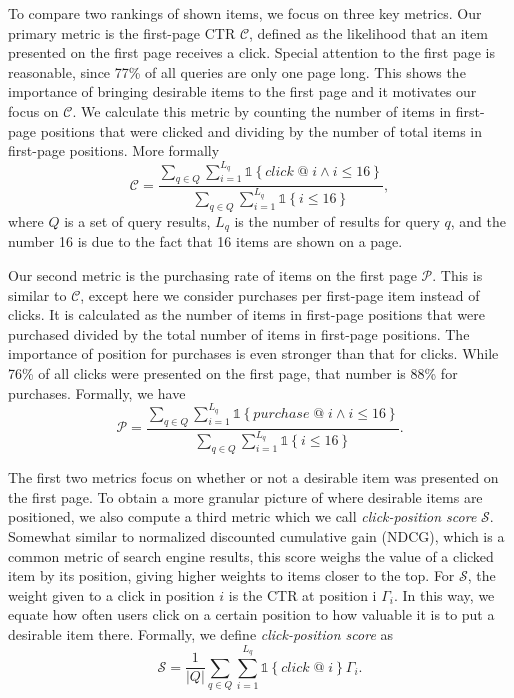 \documentclass{article}
\begin{document}
To compare two rankings of shown items, we focus on three key metrics. Our primary 
metric is the first-page CTR $\mathscr{C}$, defined as the likelihood that an item 
presented on the first page receives a click. Special attention to the first page is
reasonable, since 77\% of all queries 
are only one page long. This shows the importance of bringing desirable items to the 
first page and it motivates our focus on $\mathscr{C}$. We calculate this metric by 
counting the number of items in first-page positions that were clicked and dividing 
by the number of total items in first-page positions. More formally
\begin{equation}
    \mathscr{C} = \frac{\sum_{q \in Q}\sum_{i=1}^{L_q}\mathds{1}\left\{click\; @\; i \wedge i \leq 16\right\}}{\sum_{q \in Q}\sum_{i=1}^{L_q}\mathds{1}\left\{i \leq 16\right\}},
\end{equation}
where $Q$ is a set of query results, $L_q$ is the number of results for query $q$, and
the number 16 is due to the fact that 16 items are shown on a page.

Our second metric is the purchasing rate of items on the first page $\mathscr{P}$. This is 
similar to $\mathscr{C}$, except here we consider purchases per first-page item 
instead of clicks. It is calculated as the number of items in first-page positions that 
were purchased divided by the total number of items in first-page positions. The 
importance of position for purchases is even stronger than that for clicks. While 76\% of 
all clicks were presented on the first page, that number is 88\% for purchases. Formally,
we have
\begin{equation}
    \mathscr{P} = \frac{\sum_{q \in Q}\sum_{i=1}^{L_q}\mathds{1}\left\{purchase\; @\; i \wedge i \leq 16\right\}}{\sum_{q \in Q}\sum_{i=1}^{L_q}\mathds{1}\left\{i \leq 16\right\}}.
\end{equation}

The first two metrics focus on whether or not a desirable item was presented on the 
first page. To obtain a more granular picture of where desirable items are positioned, 
we also compute a third metric which we call {\em click-position score} $\mathscr{S}$. 
Somewhat similar to normalized discounted cumulative gain (NDCG), which is a common metric
of search engine results, this score weighs the value of a clicked item by its position, 
giving higher weights to items closer to the top. For $\mathscr{S}$, the weight given to 
a click in position $i$ is the CTR at position i $\Gamma_i$. In this way, we equate how 
often users click on a certain position to how valuable it is to put a desirable 
item there. Formally, we define {\em click-position score} as
\begin{equation}
    \mathscr{S} = \frac{1}{\left\vert{Q}\right\vert}\sum_{q \in Q}\sum_{i=1}^{L_q}\mathds{1}\left\{click\; @\; i\right\}\Gamma_i.
\end{equation}
\end{document}

